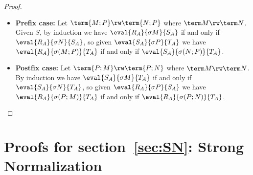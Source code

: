 \documentclass[10pt,a4paper]{amsart}
\newcommand\case[1]{\textbf{#1}}
\begin{document}
\begin{proof}
\begin{itemize}
\item\case{Prefix case:} Let $\term{M;P}\rw\term{N;P}$ where $\term M\rw\term N$. Given $S$, by induction we have $\eval{R_A}{\sigma M}{S_A}$ if and only if $\eval{R_A}{\sigma N}{S_A}$, so given $\eval{S_A}{\sigma P}{T_A}$ we have $\eval{R_A}{\sigma(M;P)}{T_A}$ if and only if $\eval{S_A}{\sigma(N;P)}{T_A}$.

\item\case{Postfix case:} Let $\term{P;M}\rw\term{P;N}$ where $\term M\rw\term N$. By induction we have $\eval{S_A}{\sigma M}{T_A}$ if and only if $\eval{S_A}{\sigma N}{T_A}$, so given $\eval{R_A}{\sigma P}{S_A}$ we have $\eval{R_A}{\sigma(P;M)}{T_A}$ if and only if $\eval{R_A}{\sigma(P;N)}{T_A}$. 
%
\qedhere
\end{itemize}
\end{proof}



\section{Proofs for section~\ref{sec:SN}: Strong Normalization}


\substitutionStrong*
\end{document}
